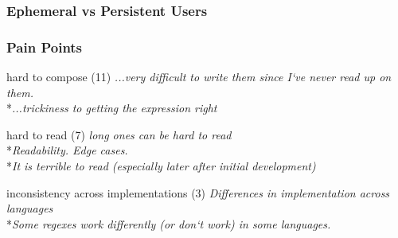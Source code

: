 \begin{frame}
\frametitle{Ephemeral vs Persistent Users}


\end{frame}


\begin{frame}
\frametitle{Pain Points}
\begin{block}{hard to compose (11)}
\emph{...very difficult to write them since I`ve never read up on them.}
\\*\emph{...trickiness to getting the expression right}
\end{block}
\begin{block}{hard to read (7)}
\emph{long ones can be hard to read}
\\*\emph{Readability. Edge cases.}
\\*\emph{It is terrible to read (especially later after initial development) }
\end{block}
\begin{block}{inconsistency across implementations (3)}
\emph{Differences in implementation across languages}
\\*\emph{Some regexes work differently (or don`t work) in some languages.}
\end{block}
\end{frame}












